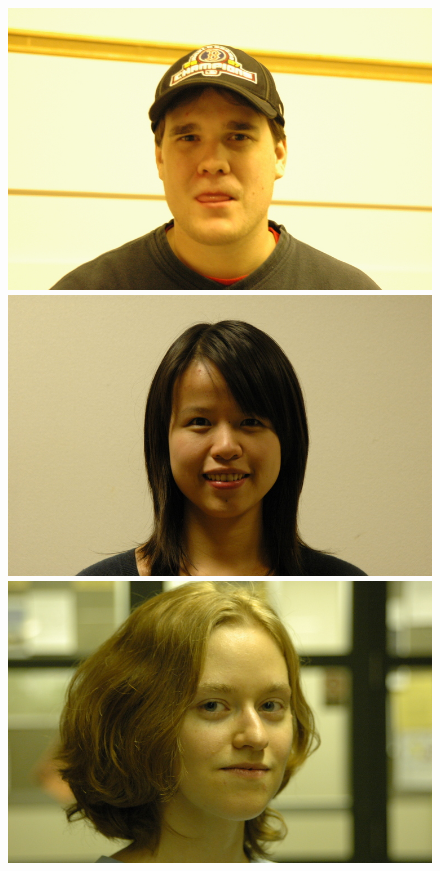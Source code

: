 \begin{figure}
\includegraphics[scale=0.35,clip=true]{figures_cvpr/examples/4/failure/DSC_1578.JPG} 
\includegraphics[scale=0.35,clip=true]{figures_cvpr/examples/4/failure/DSC_1500.JPG} 
\includegraphics[scale=0.35,clip=true]{figures_cvpr/examples/4/failure/DSC_1930.JPG} 

\end{figure}

